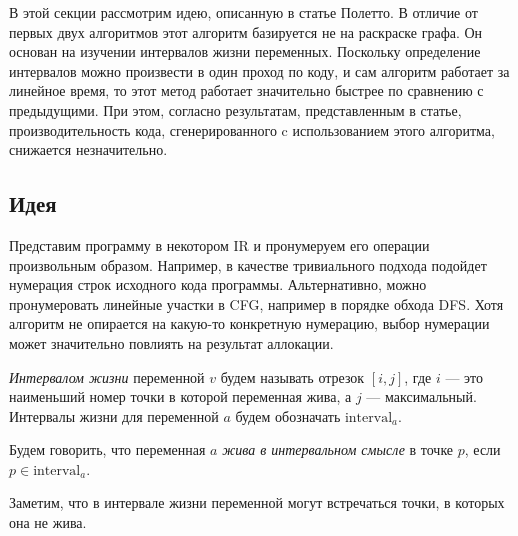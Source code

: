 В этой секции рассмотрим идею, описанную в статье Полетто. В отличие от первых двух алгоритмов
этот алгоритм базируется не на раскраске графа. Он основан на изучении интервалов жизни
переменных. Поскольку определение интервалов можно произвести в один проход по коду, и сам алгоритм
работает за линейное время, то этот метод работает значительно быстрее по сравнению с предыдущими.
При этом, согласно результатам, представленным в статье, производительность кода, сгенерированного c использованием этого алгоритма,
снижается незначительно.

\subsection{Идея}

Представим программу в некотором IR и пронумеруем его операции произвольным образом.
Например, в качестве тривиального подхода подойдет нумерация строк исходного кода программы.
Альтернативно, можно пронумеровать линейные участки в CFG, например в порядке обхода DFS.
Хотя алгоритм не опирается на какую-то конкретную нумерацию,
выбор нумерации может значительно повлиять на результат аллокации.

\begin{definition}
    \textit{Интервалом жизни} переменной $v$ будем называть отрезок $[i, j]$,
    где $i$ --- это наименьший номер точки в которой переменная жива,
    а $j$ --- максимальный.
    Интервалы жизни для переменной $a$ будем обозначать $\text{interval}_a$.
\end{definition}

\begin{definition}
    Будем говорить, что переменная $a$ \textit{жива в интервальном смысле} в точке $p$, если $p \in \text{interval}_a$. 
\end{definition}

Заметим, что в интервале жизни переменной могут встречаться точки, в которых она не жива. 

